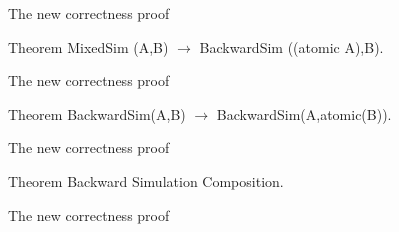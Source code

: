 %
%
%
%
\begin{frame}{The new correctness proof}
  \proofmixed
  \vfill
  \begin{block}{Theorem}
    MixedSim (A,B) $\rightarrow$ BackwardSim ((atomic A),B).
  \end{block}
\end{frame}

\begin{frame}{The new correctness proof}
  \proofmixedbwd
  \vfill
  \begin{block}{Theorem}
    BackwardSim(A,B) $\rightarrow$ BackwardSim(A,atomic(B)).
  \end{block}
\end{frame}

\begin{frame}{The new correctness proof}
  \proofatbwd
  \vfill
  \begin{block}{Theorem}
    Backward Simulation Composition.
  \end{block}
\end{frame}

\begin{frame}{The new correctness proof}
  \prooffinal
\end{frame}

